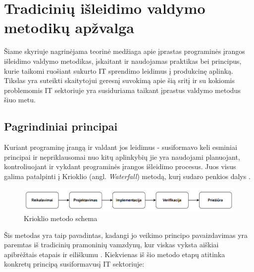 \documentclass{VUMIFPSkursinis}
\begin{document}




\section{Tradicinių išleidimo valdymo metodikų apžvalga}
Šiame skyriuje nagrinėjama teorinė medžiaga apie įprastas programinės įrangos išleidimo valdymo metodikas, įskaitant ir naudojamas praktikas bei principus, kurie taikomi ruošiant sukurto IT sprendimo leidimus į produkcinę aplinką. Tikslas yra suteikti skaitytojui geresnį suvokimą apie šią sritį ir su kokiomis problemomis IT sektoriuje yra susiduriama taikant įprastus valdymo metodus šiuo metu.

\subsection{Pagrindiniai principai}
Kuriant programinę įrangą ir valdant jos leidimus - susiformavo keli esminiai principai ir nepriklausomai nuo kitų aplinkybių jie yra naudojami planuojant, kontroliuojant ir vykdant programinės įrangos išleidimo procesus. Juos visus galima patalpinti į Krioklio (angl. \textit{Waterfall}) metodą, kurį sudaro penkios dalys \cite{SaltTrecias}.

\begin{figure}[H]
    \centering
    \includegraphics[scale=0.5]{img/WaterfallLT2.png}
    \caption{Krioklio metodo schema}
    \label{img:mlp}
\end{figure}

Šis metodas yra taip pavadintas, kadangi jo veikimo principo pavaizdavimas yra paremtas iš tradicinių pramoninių vamzdynų, kur viskas vyksta aiškiai apibrėžtais etapais ir eiliškumu \cite{SaltTrecias}. Kiekvienas iš šio metodo etapų atitinka konkretų principą susiformavusį IT sektoriuje:
\end{document}
